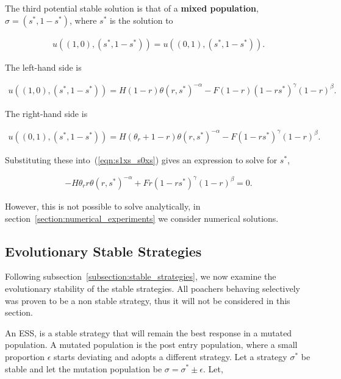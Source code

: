 \documentclass[10pt]{article}
\begin{document}
The third potential stable solution is that of a \textbf{mixed population}, 
\(\sigma = (s^*, 1 - s^*)\), where \(s^*\) is the solution to

\begin{eqnarray}
\label{eqn:s1xs_s0xs}
u((1, 0),(s^*, 1 - s^*)) = u((0, 1),(s^*, 1 - s^*)).
\end{eqnarray}

The left-hand side is

\begin{eqnarray} \nonumber
u((1, 0),(s^*, 1 - s^*)) =
H(1 - r) \theta(r, s^*)^{-\alpha} - F (1 - r)(1 - rs^*)^{\gamma}(1 - r)^{\beta} .
\end{eqnarray}

The right-hand side is

\begin{eqnarray} \nonumber
u((0, 1),(s^*, 1 - s^*)) =
H(\theta_r + 1 - r)\theta(r, s^*)^{-\alpha} - F(1 - rs^*)^{\gamma}(1 - r)^{\beta} .
\end{eqnarray}

Substituting these into~(\ref{eqn:s1xs_s0xs}) gives an expression to solve for \(s^*\),

\begin{eqnarray}
\label{eqn:stablemixed}
- H \theta_r r \theta(r, s^*)^{-\alpha}  + F r (1 - rs^*)^{\gamma}(1 - r)^{\beta} = 0.
\end{eqnarray}

However, this is not possible to solve analytically, in section~\ref{section:numerical_experiments}
we consider numerical solutions.

\subsection{Evolutionary Stable Strategies}\label{subsection:evolutionary_stable_strategies}

Following subsection~\ref{subsection:stable_strategies}, we now examine the evolutionary
stability of the stable strategies. All poachers behaving selectively was proven to be a non stable
strategy, thus it will not be considered in this section.  

An ESS, is a stable strategy that will remain the best response in a mutated population.
A mutated population  is the post entry population, where a small proportion
\(\epsilon\) starts deviating and adopts a different strategy.  Let a strategy 
\(\sigma^*\) be stable and let the mutation population be \(\sigma = \sigma^*
\pm \epsilon\).  Let, 
\end{document}
